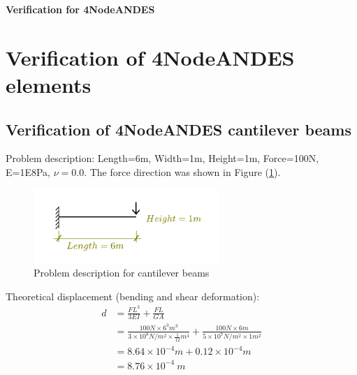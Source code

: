 \documentclass[fleqn,11pt,letter]{article}
\begin{document}


















\newpage
\begin{center}
  \Large\textbf{Verification for 4NodeANDES}
\end{center}


\vskip 24pt

\section{Verification of 4NodeANDES elements}
\subsection{Verification of 4NodeANDES cantilever beams}





Problem description: Length=6m, Width=1m, Height=1m, Force=100N, E=1E8Pa, $\nu=0.0$. The force direction was shown in Figure (\ref{fig Problem description for cantilever 4}). 

\begin{figure}[H]
  \centering
  \includegraphics[width=7cm]{../Figure_files/4NodeANDES/cantilever_6.pdf}
  \caption{Problem description for cantilever beams}
  \label{fig Problem description for cantilever 4}
\end{figure}


Theoretical displacement (bending and shear deformation):
\begin{equation}
  \begin{aligned}
  d &=\frac{FL^3}{3EI}+\frac{FL}{GA} \\ 
    &= \frac{100 N \times 6^3 m^3}{3\times 10^8 N/m^2 \times \frac{1}{12} m^4}+ 
    \frac{100 N\times 6 m}{5\times 10^7 N/m^2\times 1 m^2} \\ 
    &=8.64\times 10^{-4} m + 0.12 \times 10^{-4} m  \\
   & =8.76\times 10^{-4} \ m
   \end{aligned}
\end{equation}
\end{document}
